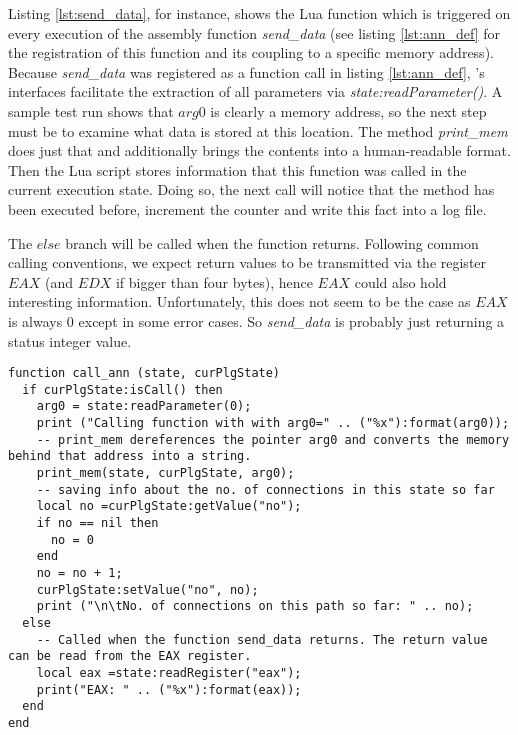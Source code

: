 Listing \ref{lst:send_data}, for instance, shows the Lua function which is triggered on every execution of the assembly function \textit{send\_data} (see listing \ref{lst:ann_def} for the registration of this function and its coupling to a specific memory address).
Because \textit{send\_data} was registered as a function call in listing \ref{lst:ann_def}, \sse's interfaces facilitate the extraction of all parameters via \textit{state:readParameter()}.
A sample test run shows that $arg0$ is clearly a memory address, so the next step must be to examine what data is stored at this location.
The method \textit{print\_mem} does just that and additionally brings the contents into a human-readable format.
Then the Lua script stores information that this function was called in the current execution state.
Doing so, the next call will notice that the method has been executed before, increment the counter and write this fact into a log file.

The $else$ branch will be called when the function returns.
Following common calling conventions, we expect return values to be transmitted via the register $EAX$ (and $EDX$ if bigger than four bytes), hence $EAX$ could also hold interesting information.
Unfortunately, this does not seem to be the case as $EAX$ is always $0$ except in some error cases.
So \textit{send\_data} is probably just returning a status integer value.







\bigskip
\begin{lstlisting}[language={[5.0]Lua}, basicstyle=\ttfamily\footnotesize, caption={Lua function executed upon every call of the function send\_data().}, label={lst:send_data}]
function call_ann (state, curPlgState)
  if curPlgState:isCall() then
    arg0 = state:readParameter(0);
    print ("Calling function with with arg0=" .. ("%x"):format(arg0));
    -- print_mem dereferences the pointer arg0 and converts the memory behind that address into a string.
    print_mem(state, curPlgState, arg0);
    -- saving info about the no. of connections in this state so far
    local no =curPlgState:getValue("no");
    if no == nil then
      no = 0
    end
    no = no + 1;
    curPlgState:setValue("no", no);
    print ("\n\tNo. of connections on this path so far: " .. no);
  else
    -- Called when the function send_data returns. The return value can be read from the EAX register.
    local eax =state:readRegister("eax");
    print("EAX: " .. ("%x"):format(eax));
  end
end
\end{lstlisting}
\bigskip

